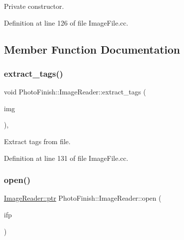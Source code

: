 Private constructor. 



Definition at line 126 of file Image\+File.\+cc.



\subsection{Member Function Documentation}
\mbox{\label{class_photo_finish_1_1_image_reader_a753ec07db45220b64a28d60200f5c3e2}} 
\subsubsection{\texorpdfstring{extract\+\_\+tags()}{extract\_tags()}}
{\footnotesize\ttfamily void Photo\+Finish\+::\+Image\+Reader\+::extract\+\_\+tags (\begin{DoxyParamCaption}\item[{\hyperlink{class_photo_finish_1_1_image_ab336203305ed3a1397d7245063353b5a}{Image\+::ptr}}]{img }\end{DoxyParamCaption})\hspace{0.3cm}{\ttfamily [protected]}, {\ttfamily [virtual]}}



Extract tags from file. 



Definition at line 131 of file Image\+File.\+cc.

\mbox{\label{class_photo_finish_1_1_image_reader_a8d27d2cf762f16189fbdd41182a1dc9e}} 
\subsubsection{\texorpdfstring{open()}{open()}}
{\footnotesize\ttfamily \hyperlink{class_photo_finish_1_1_image_reader_a4f077d55ff971217578dc51db00715aa}{Image\+Reader\+::ptr} Photo\+Finish\+::\+Image\+Reader\+::open (\begin{DoxyParamCaption}\item[{const \hyperlink{class_photo_finish_1_1_image_filepath}{Image\+Filepath} \&}]{ifp }\end{DoxyParamCaption})\hspace{0.3cm}{\ttfamily [static]}}



